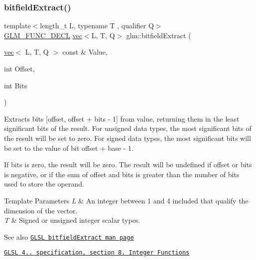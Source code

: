 \subsubsection{\texorpdfstring{bitfield\+Extract()}{bitfieldExtract()}}
{\footnotesize\ttfamily template$<$length\+\_\+t L, typename T , qualifier Q$>$ \\
\hyperlink{setup_8hpp_ab2d052de21a70539923e9bcbf6e83a51}{G\+L\+M\+\_\+\+F\+U\+N\+C\+\_\+\+D\+E\+CL} \hyperlink{structglm_1_1vec}{vec}$<$L, T, Q$>$ glm\+::bitfield\+Extract (\begin{DoxyParamCaption}\item[{\hyperlink{structglm_1_1vec}{vec}$<$ L, T, Q $>$ const \&}]{Value,  }\item[{int}]{Offset,  }\item[{int}]{Bits }\end{DoxyParamCaption})}

Extracts bits \mbox{[}offset, offset + bits -\/ 1\mbox{]} from value, returning them in the least significant bits of the result. For unsigned data types, the most significant bits of the result will be set to zero. For signed data types, the most significant bits will be set to the value of bit offset + base -\/ 1.

If bits is zero, the result will be zero. The result will be undefined if offset or bits is negative, or if the sum of offset and bits is greater than the number of bits used to store the operand.


\begin{DoxyTemplParams}{Template Parameters}
{\em L} & An integer between 1 and 4 included that qualify the dimension of the vector. \\
\hline
{\em T} & Signed or unsigned integer scalar types.\\
\hline
\end{DoxyTemplParams}
\begin{DoxySeeAlso}{See also}
\href{http://www.opengl.org/sdk/docs/manglsl/xhtml/bitfieldExtract.xml}{\tt G\+L\+SL bitfield\+Extract man page} 

\href{http://www.opengl.org/registry/doc/GLSLangSpec.4.20.8.pdf}{\tt G\+L\+SL 4.. specification, section 8. Integer Functions} 
\end{DoxySeeAlso}
\mbox{\label{group__core__func__integer_ga2e82992340d421fadb61a473df699b20}} 
